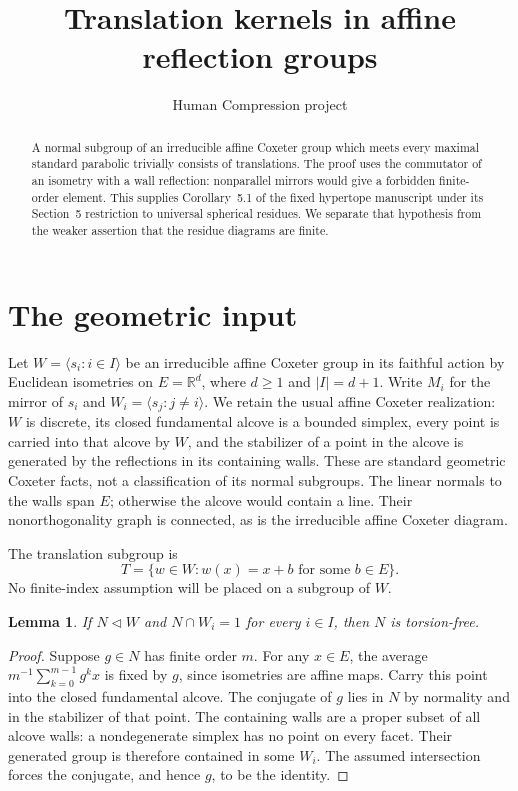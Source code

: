 \documentclass[11pt,a4paper]{article}
\title{Translation kernels in affine reflection groups}
\author{Human Compression project}
\date{}
\newtheorem{lemma}[theorem]{Lemma}
\newcommand{\gen}[1]{\langle #1\rangle}
\begin{document}
\maketitle

\begin{abstract}
A normal subgroup of an irreducible affine Coxeter group which meets
every maximal standard parabolic trivially consists of translations.
The proof uses the commutator of an isometry with a wall reflection:
nonparallel mirrors would give a forbidden finite-order element.
This supplies Corollary~5.1 of the fixed hypertope manuscript under its
Section~5 restriction to universal spherical residues. We separate that
hypothesis from the weaker assertion that the residue diagrams are finite.
\end{abstract}

\section{The geometric input}

Let $W=\gen{s_i:i\in I}$ be an irreducible affine Coxeter group in its
faithful action by Euclidean isometries on $E=\mathbb R^d$, where
$d\geq1$ and $|I|=d+1$. Write $M_i$ for the mirror of $s_i$ and
$W_i=\gen{s_j:j\ne i}$. We retain the usual affine Coxeter realization:
$W$ is discrete, its closed fundamental alcove is a bounded simplex,
every point is carried into that alcove by $W$, and the stabilizer of a
point in the alcove is generated by the reflections in its containing
walls. These are standard geometric Coxeter facts, not a classification
of its normal subgroups. The linear normals to the walls span $E$;
otherwise the alcove would contain a line. Their nonorthogonality graph
is connected, as is the irreducible affine Coxeter diagram.

The translation subgroup is
\[
 T=\{w\in W:w(x)=x+b\text{ for some }b\in E\}.
\]
No finite-index assumption will be placed on a subgroup of $W$.

\begin{lemma}\label{torsion}
If $N\triangleleft W$ and $N\cap W_i=1$ for every $i\in I$, then
$N$ is torsion-free.
\end{lemma}
\begin{proof}
Suppose $g\in N$ has finite order $m$. For any $x\in E$, the average
$m^{-1}\sum_{k=0}^{m-1}g^k x$ is fixed by $g$, since isometries are
affine maps. Carry this point into the closed fundamental alcove.
The conjugate of $g$ lies in $N$ by normality and in the stabilizer
of that point. The containing walls are a proper subset of all alcove
walls: a nondegenerate simplex has no point on every facet.
Their generated group is therefore contained in some $W_i$.
The assumed intersection forces the conjugate, and hence $g$, to be
the identity.
\end{proof}
\end{document}
